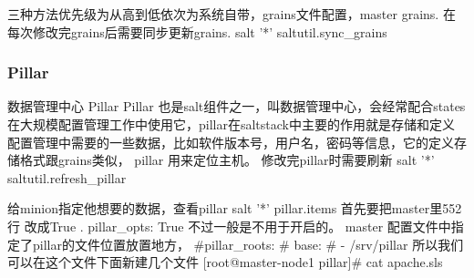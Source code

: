 三种方法优先级为从高到低依次为系统自带，grains文件配置，master grains. 在每次修改完grains后需要同步更新grains.  salt '*' saltutil.sync_grains

\subsubsection{Pillar}
数据管理中心 Pillar
Pillar 也是salt组件之一，叫数据管理中心，会经常配合states在大规模配置管理工作中使用它，pillar在saltstack中主要的作用就是存储和定义配置管理中需要的一些数据，比如软件版本号，用户名，密码等信息，它的定义存储格式跟grains类似，
pillar 用来定位主机。 修改完pillar时需要刷新 salt '*' saltutil.refresh_pillar


给minion指定他想要的数据，查看pillar salt '*' pillar.items 
首先要把master里552行 改成True . pillar_opts: True 不过一般是不用于开启的。 
master 配置文件中指定了pillar的文件位置放置地方，
#pillar_roots:
# base:
# - /srv/pillar
所以我们可以在这个文件下面新建几个文件
[root@master-node1 pillar]# cat apache.sls
